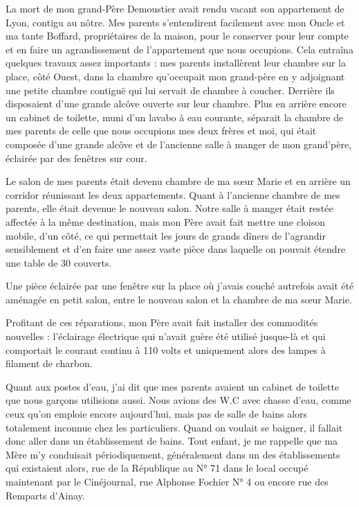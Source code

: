\documentclass[11pt,a4paper]{report}
\begin{document}
La mort de mon grand-Père Demoustier avait rendu vacant son appartement de Lyon, contigu au nôtre. Mes parents s'entendirent facilement avec mon Oncle et ma tante Boffard, propriétaires de la maison, pour le conserver pour leur compte et en faire un agrandissement de l'appartement que nous occupions. Cela entraîna quelques travaux assez importants : mes parents installèrent leur chambre sur la place, côté Ouest, dans la chambre qu'occupait mon grand-père en y adjoignant une petite chambre contiguë qui lui servait de chambre à coucher. Derrière ils disposaient d'une grande alcôve ouverte sur leur chambre. Plus en arrière encore un cabinet de toilette, muni d'un lavabo à eau courante, séparait la chambre de mes parents de celle que nous occupions mes deux frères et moi, qui était composée d'une grande alcôve et de l'ancienne salle à manger de mon grand'père, éclairée par des fenêtres sur cour.

Le salon de mes parents était devenu chambre de ma sœur Marie et en arrière un corridor réunissant les deux appartements. Quant à l'ancienne chambre de mes parents, elle était devenue le nouveau salon. Notre salle à manger était restée affectée à la même destination, mais mon Père avait fait mettre une cloison mobile, d'un côté, ce qui permettait les jours de grands dîners de l'agrandir sensiblement et d'en faire une assez vaste pièce dans laquelle on pouvait étendre une table de 30 couverts.

Une pièce éclairée par une fenêtre sur la place où j'avais couché autrefois avait été aménagée en petit salon, entre le nouveau salon et la chambre de ma sœur Marie.

Profitant de ces réparations, mon Père avait fait installer des commodités nouvelles : l'éclairage électrique qui n'avait guère été utilisé jusque-là et qui comportait le courant continu à 110 volts et uniquement alors des lampes à filament de charbon.

Quant aux postes d'eau, j'ai dit que mes parents avaient un cabinet de toilette que nous garçons utilisions aussi. Nous avions des W.C avec chasse d'eau, comme ceux qu'on emploie encore aujourd'hui, mais pas de salle de bains alors totalement inconnue chez les particuliers. Quand on voulait se baigner, il fallait donc aller dans un établissement de bains. Tout enfant, je me rappelle que ma Mère m'y conduisait périodiquement, généralement dans un des établissements qui existaient alors, rue de la République au N° 71 dans le local occupé maintenant par le Cinéjournal, rue Alphonse Fochier N° 4 ou encore rue des Remparts d'Ainay.
\end{document}
